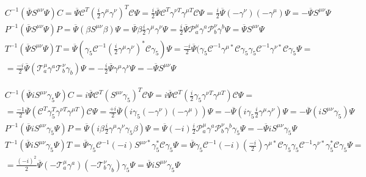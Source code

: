 \documentclass[twoside]{amsart}
\begin{document}
\[
\begin{aligned}
  & C^{-1} ( \overline{ \Psi} S^{\mu \nu } \Psi ) C   = \overline{\Psi} \mathcal{C}^T \left( \frac{i}{2} \gamma^{\mu} \gamma^{\nu} \right)^T \mathcal{C} \Psi = \frac{i}{2} \overline{\Psi} \mathcal{C}^T \gamma^{\nu T} \gamma^{\mu T} \mathcal{C} \Psi = \frac{i}{2} \overline{\Psi} (- \gamma^{\nu}) ( - \gamma^{\mu}) \Psi = - \overline{\Psi} S^{\mu \nu} \Psi \\
  & P^{-1} ( \overline{ \Psi} S^{\mu \nu } \Psi ) P   = \overline{\Psi} (\beta S^{\mu \nu} \beta) \Psi = \overline{ \Psi} \beta \frac{i}{2} \gamma^{\mu} \gamma^{\nu} \Psi = \frac{i}{2} \overline{\Psi} \mathcal{P}^{\mu}_a \gamma^a \mathcal{P}^{\nu}_b \gamma^b \Psi = \overline{\Psi} S^{\mu \nu} \Psi \\ 
  & T^{-1} ( \overline{ \Psi} S^{\mu \nu } \Psi ) T   =  \overline{\Psi} ( \gamma_5 \mathcal{C}^{-1} \left( \frac{i}{2} \gamma^{\mu} \gamma^{\nu} \right)^* \mathcal{C} \gamma_5 ) \Psi = \frac{-i}{2} \overline{\Psi} (\gamma_5 \mathcal{C}^{-1} \gamma^{\mu *} \mathcal{C} \gamma_5 \gamma_5 \mathcal{C}^{-1} \gamma^{\nu *} \mathcal{C} \gamma_5 \Psi = \\
  & = \frac{-i}{2} \overline{\Psi} ( \mathcal{T}^{\mu}_a \gamma^a \mathcal{T}^{\nu}_b \gamma_b ) \Psi = - \frac{i}{2} \overline{\Psi} \gamma^{\mu} \gamma^{\nu} \Psi = - \overline{\Psi} S^{\mu \nu} \Psi 
\end{aligned}
\]

\[
\begin{aligned}
  & C^{-1} ( \overline{ \Psi} i S^{\mu \nu } \gamma_5 \Psi ) C   = i \overline{\Psi} \mathcal{C}^T \left( S^{\mu \nu} \gamma_5 \right)^T \mathcal{C} \Psi = i \overline{\Psi} \mathcal{C}^T \left( \frac{i}{2} \gamma_5 \gamma^{\nu T} \gamma^{\mu T} \right) \mathcal{C} \Psi = \\
  & = \frac{-1}{2} \overline{\Psi} ( \mathcal{C}^T \gamma_5^T \gamma^{\nu T} \gamma^{\mu T} ) \mathcal{C} \Psi = \frac{+i}{2} \overline{\Psi} (i \gamma_5 (-\gamma^{\nu } )(- \gamma^{\mu} ) ) \Psi  = - \overline{\Psi} (i \gamma_5 \frac{i}{2} \gamma^{\mu} \gamma^{\nu} ) \Psi = - \overline{\Psi} ( i  S^{\mu \nu} \gamma_5) \Psi \\
  & P^{-1} ( \overline{ \Psi} i S^{\mu \nu } \gamma_5 \Psi ) P   = \overline{\Psi} (i \beta \frac{i}{2} \gamma^{\mu} \gamma^{\nu} \gamma_5  \beta) \Psi = \overline{ \Psi} (-i) \frac{i}{2} \mathcal{P}^{\mu}_a \gamma^a \mathcal{P}^{\nu}_b \gamma^b \gamma_5 \Psi = -\overline{\Psi} i S^{\mu \nu} \gamma_5 \Psi \\ 
  & T^{-1} ( \overline{ \Psi} i S^{\mu \nu } \gamma_5 \Psi ) T   =  \overline{\Psi}  \gamma_5 \mathcal{C}^{-1} (-i) S^{\mu \nu *} \gamma_5^*  \mathcal{C} \gamma_5  \Psi =  \overline{\Psi} \gamma_5 \mathcal{C}^{-1} (-i) \left( \frac{-i}{2} \right) \gamma^{\mu *} \mathcal{C} \gamma_5 \gamma_5 \mathcal{C}^{-1} \gamma^{\nu *} \gamma_5^* \mathcal{C} \gamma_5 \Psi = \\
  & = \frac{(-i)^2 }{2} \overline{\Psi} ( -\mathcal{T}^{\mu}_a \gamma^a)( -\mathcal{T}^{\nu}_b \gamma_b ) \gamma_5 \Psi =  \overline{\Psi} i  S^{\mu \nu} \gamma_5 \Psi 
\end{aligned}
\]
\end{document}
